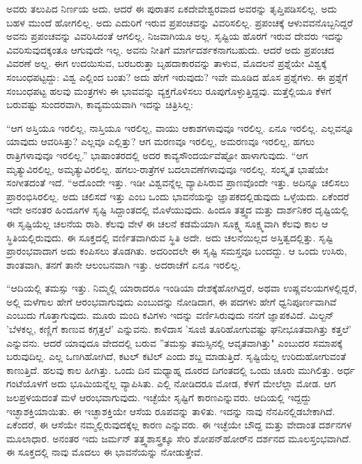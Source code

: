 ಅವರು ತಲುಪಿದ ನಿರ್ಣಯ ಅದು. ಆದರೆ ಈ ಪುರಾತನ ಏಕದೇವೇಶ್ವರವಾದ ಅವರನ್ನು ತೃಪ್ತಿಪಡಿಸಲಿಲ್ಲ. ಅದು ಬಹಳ ಮುಂದೆ ಹೋಗಲಿಲ್ಲ. ಅದು ಎದುರಿಗೆ ಇರುವ ಪ್ರಪಂಚವನ್ನು ವಿವರಿಸಲಿಲ್ಲ. ಪ್ರಪಂಚಕ್ಕೆ ಆಳುವವನೊಬ್ಬನಿದ್ದರೆ ಅವನು ಪ್ರಪಂಚವನ್ನು ವಿವರಿಸಿದಂತೆ ಆಗಲಿಲ್ಲ. ನಿಜವಾಗಿಯೂ ಅಲ್ಲ. ಸೃಷ್ಟಿಯ ಹೊರಗೆ ಇರುವ ದೇವರು ಇದನ್ನು ವಿವರಿಸುವುದಕ್ಕಂತೂ ಆಗುವುದೇ ಇಲ್ಲ. ಅವನು ನೀತಿಗೆ ಮಾರ್ಗದರ್ಶಕನಾಗಬಹುದು. ಆದರೆ ಅದು ಪ್ರಪಂಚದ ವಿವರಣೆ ಅಲ್ಲ. ಈಗ ಉದಯಿಸುವ, ಬರಬರುತ್ತಾ ಬೃಹದಾಕಾರವನ್ನು ತಾಳುವ, ಮೊದಲನೆ ಪ್ರಶ್ನೆಯೇ ವಿಶ್ವಕ್ಕೆ ಸಂಬಂಧಪಟ್ಟದ್ದು: ವಿಶ್ವ ಎಲ್ಲಿಂದ ಬಂತು? ಅದು ಹೇಗೆ ಇರುವುದು? ಇವೇ ಮೂಡಿದ ಹೊಸ ಪ್ರಶ್ನೆಗಳು. ಈ ಪ್ರಶ್ನೆಗೆ ಸಂಬಂಧಪಟ್ಟ ಹಲವು ಮಂತ್ರಗಳು ಈ ಭಾವವನ್ನು ವ್ಯಕ್ತಗೊಳಿಸಲು ರೂಪುಗೊಳ್ಳುತ್ತಿದ್ದವು. ಮತ್ತೆಲ್ಲಿಯೂ ಕೆಳಗೆ ಬರುವಷ್ಟು ಸುಂದರವಾಗಿ, ಕಾವ್ಯಮಯವಾಗಿ ಇದನ್ನು ಚಿತ್ರಿಸಿಲ್ಲ:

“ಆಗ ಅಸ್ತಿಯೂ ಇರಲಿಲ್ಲ, ನಾಸ್ತಿಯೂ ಇರಲಿಲ್ಲ, ವಾಯು ಆಕಾಶಗಳಾವುವೂ ಇರಲಿಲ್ಲ. ಏನೂ ಇರಲಿಲ್ಲ. ಎಲ್ಲವನ್ನೂ ಯಾವುದು ಆವರಿಸಿತ್ತು? ಎಲ್ಲವೂ ಎಲ್ಲಿತ್ತು? ಆಗ ಮರಣವೂ ಇರಲಿಲ್ಲ, ಅಮರಣವೂ ಇರಲಿಲ್ಲ, ಹಗಲು ರಾತ್ರಿಗಳಾವುವೂ ಇರಲಿಲ್ಲ.” ಭಾಷಾಂತರದಲ್ಲಿ ಅದರ ಕಾವ್ಯಸೌಂದರ್ಯವೆಷ್ಟೋ ಹಾಳಾಗುವುದು. “ಆಗ ಮೃತ್ಯುವಿರಲಿಲ್ಲ, ಅಮೃತ್ಯುವಿರಲಿಲ್ಲ. ಹಗಲು-ರಾತ್ರೆಗಳ ಬದಲಾವಣೆಗಳಾವುವೂ ಇರಲಿಲ್ಲ. ಸಂಸ್ಕೃತ ಭಾಷೆಯೇ ಸಂಗೀತದಂತೆ ಇದೆ. “ಅದೊಂದೇ ಇತ್ತು. ಇಡೀ ವಿಶ್ವವನ್ನೆಲ್ಲ ವ್ಯಾಪಿಸಿರುವ ಪ್ರಾಣವೊಂದೇ ಇತ್ತು. ಅದಿನ್ನೂ ಚಲಿಸಲು ಪ್ರಾರಂಭಿಸಿರಲಿಲ್ಲ. ಅದು ಚಲಿಸದೆ ಇತ್ತು ಎಂಬ ಒಂದು ಭಾವನೆಯನ್ನು ಜ್ಞಾಪಕದಲ್ಲಿಡುವುದು ಒಳ್ಳೆಯದು. ಏಕೆಂದರೆ ಇದೇ ಅನಂತರ ಹಿಂದೂಗಳ ಸೃಷ್ಟಿ ಸಿದ್ದಾಂತದಲ್ಲಿ ಮೊಳೆಯುವುದು. ಹಿಂದೂ ತತ್ತ್ವದ ಮತ್ತು ದಾರ್ಶನಿಕರ ದೃಷ್ಟಿಯಲ್ಲಿ ಈ ಸೃಷ್ಟಿಯೆಲ್ಲ ಚಲನೆಯ ರಾಶಿ. ಕೆಲವು ವೇಳೆ ಈ ಚಲನೆ ಕಡಮೆಯಾಗಿ ಸೂಕ್ಷ್ಮ ಸೂಕ್ಷ್ಮವಾಗಿ ಕೆಲವು ಕಾಲ ಆ ಸ್ಥಿತಿಯಲ್ಲಿರುವುದು. ಈ ಸೂಕ್ತದಲ್ಲಿ ವರ್ಣಿತವಾಗಿರುವ ಸ್ಥಿತಿ ಅದೇ. ಅದು ಚಲನೆಯಿಲ್ಲದ ಅಸ್ತಿತ್ವದಲ್ಲಿತ್ತು. ಸೃಷ್ಟಿ ಪ್ರಾರಂಭವಾದಾಗ ಅದು ಕಂಪಿಸಲು ತೊಡಗಿತು. ಅದರಿಂದಲೇ ಈ ಸೃಷ್ಟಿ ಸಮಸ್ತವೂ ಬಂದದ್ದು. ಆ ಒಂದು ಉಸಿರು, ಶಾಂತವಾಗಿ, ತನಗೆ ತಾನೇ ಆಲಂಬನವಾಗಿ ಇತ್ತು. ಅದರಾಚೆಗೆ ಏನೂ ಇರಲಿಲ್ಲ.

“ಆದಿಯಲ್ಲಿ ತಮಸ್ಸು ಇತ್ತು. ನಿಮ್ಮಲ್ಲಿ ಯಾರಾದರೂ ಇಂಡಿಯಾ ದೇಶಕ್ಕೆ\break ಹೋಗಿದ್ದರೆ, ಅಥವಾ ಉಷ್ಣವಲಯಗಳಲ್ಲಿದ್ದರೆ, ಅಲ್ಲಿ ಮಳೆಗಾಲ ಹೇಗೆ ಆರಂಭವಾಗುವುದು ಎಂಬುದನ್ನು ನೋಡಿದಾಗ, ಈ ಪದಗಳು ಹೇಗೆ ಧ್ವನಿಪೂರ್ಣವಾಗಿವೆ ಎಂಬುದು ಗೊತ್ತಾಗುವುದು. ಮೂರು ಮಂದಿ ಕವಿಗಳು ಇದನ್ನು ವರ್ಣಿಸಿರುವುದು ನನಗೆ ಜ್ಞಾಪಕವಿದೆ. ಮಿಲ್ಟನ್  'ಬೆಳಕಲ್ಲ, ಕಣ್ಣಿಗೆ ಕಾಣುವ ಕಗ್ಗತ್ತಲೆ' ಎನ್ನುವನು. ಕಾಳಿದಾಸ 'ಸೂಜಿ ತೂರಿಹೋಗುವಷ್ಟು ಘನೀಭೂತವಾಗಿತ್ತು ಕತ್ತಲೆ' ಎನ್ನುವನು. ಆದರೆ ಯಾವುದೂ ವೇದದಲ್ಲಿ ಬರುವ ''ತಮಸ್ಸು ತಮಸ್ಸಿನಲ್ಲಿ ಆವೃತವಾಗಿತ್ತು" ಎಂಬುದರ ಸಮಾಪಕ್ಕೆ ಬರುವುದಿಲ್ಲ. ಎಲ್ಲ ಒಣಗಿಹೋಗಿದೆ, ಕಟಲ್ ಕಟಿಲ್ ಎಂದು ಶಬ್ದ ಮಾಡುತ್ತಿದೆ. ಸೃಷ್ಟಿಯೆಲ್ಲ ಉರಿದುಹೋಗುವಂತೆ ಕಾಣುತ್ತಿದೆ. ಹಲವು ಕಾಲ ಹೀಗಿತ್ತು. ಒಂದು ದಿನ ಮಧ್ಯಾಹ್ನ ದೂರದ ದಿಗಂತದಲ್ಲಿ ಒಂದು ಚೂರು ಮುಗಿಲಿತ್ತು. ಅರ್ಧ ಗಂಟೆಯೊಳಗೆ ಅದು ಭೂಮಿಯನ್ನೆಲ್ಲ ವ್ಯಾಪಿಸಿತು. ಎಲ್ಲಿ ನೋಡಿದರೂ ಮೋಡ, ಕೆಳಗೆ ಮೇಲೆಲ್ಲಾ ಮೋಡ. ಆಗ ಜಲಪ್ರಳಯದಂತೆ ಮಳೆ ಆರಂಭವಾಗುವುದು. ಇಚ್ಛೆಯೇ ಸೃಷ್ಟಿಗೆ ಕಾರಣ\break ಎನ್ನುವರು. ಆದಿಯಲ್ಲಿ ಇದ್ದದ್ದು ಇಚ್ಛಾಶಕ್ತಿಯಾಯಿತು. ಈ ಇಚ್ಛಾಶಕ್ತಿಯೇ ಆಸೆಯ ರೂಪವನ್ನು ತಾಳಿತು. ಇದನ್ನು ನಾವು ನೆನಪಿನಲ್ಲಿಡಬೇಕಾಗಿದೆ. ಏಕೆಂದರೆ, ಈ ಆಸೆಯೇ ನಮ್ಮಲ್ಲಿರುವುದಕ್ಕೆಲ್ಲ ಕಾರಣ ಎನ್ನುವರು. ಈ ಇಚ್ಛೆಯೇ ಬೌದ್ದ ಮತ್ತು ವೇದಾಂತ ದರ್ಶನಗಳ ಮೂಲಾಧಾರ. ಅನಂತರ ಇದು ಜರ್ಮನ್ ತತ್ತ್ವಶಾಸ್ತ್ರಕ್ಕೂ ಸೇರಿ ಶೋಪನ್‌ಹೋರ್‌ನ ದರ್ಶನದ ಮೂಲಸ್ತಂಭವಾಗಿದೆ. ಈ ಸೂಕ್ತದಲ್ಲಿ ನಾವು ಮೊದಲು ಈ ಭಾವನೆಯನ್ನು ನೋಡುತ್ತೇವೆ.

